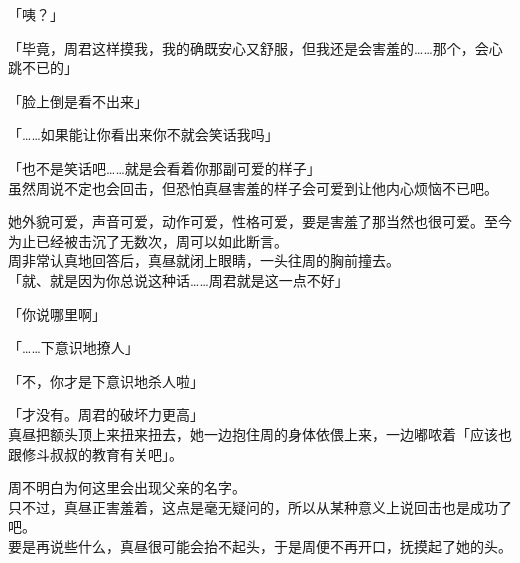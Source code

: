 「咦？」

「毕竟，周君这样摸我，我的确既安心又舒服，但我还是会害羞的……那个，会心跳不已的」

「脸上倒是看不出来」

「……如果能让你看出来你不就会笑话我吗」

「也不是笑话吧……就是会看着你那副可爱的样子」\\

虽然周说不定也会回击，但恐怕真昼害羞的样子会可爱到让他内心烦恼不已吧。

她外貌可爱，声音可爱，动作可爱，性格可爱，要是害羞了那当然也很可爱。至今为止已经被击沉了无数次，周可以如此断言。\\

周非常认真地回答后，真昼就闭上眼睛，一头往周的胸前撞去。\\

「就、就是因为你总说这种话……周君就是这一点不好」

「你说哪里啊」

「……下意识地撩人」

「不，你才是下意识地杀人啦」

「才没有。周君的破坏力更高」\\

真昼把额头顶上来扭来扭去，她一边抱住周的身体依偎上来，一边嘟哝着「应该也跟修斗叔叔的教育有关吧」。

周不明白为何这里会出现父亲的名字。\\

只不过，真昼正害羞着，这点是毫无疑问的，所以从某种意义上说回击也是成功了吧。\\

要是再说些什么，真昼很可能会抬不起头，于是周便不再开口，抚摸起了她的头。
